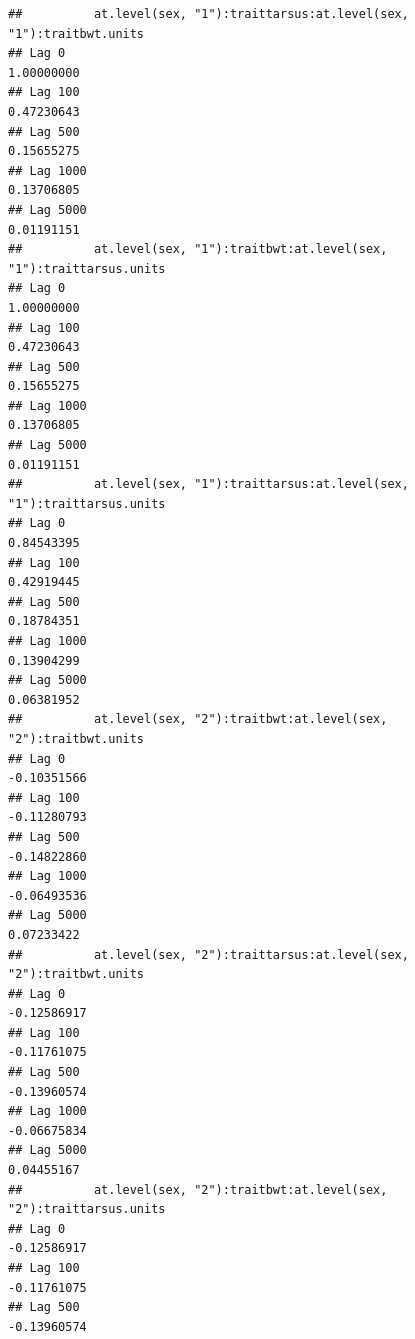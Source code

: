 \documentclass[
  12pt,
]{book}
\begin{document}
\begin{verbatim}
##          at.level(sex, "1"):traittarsus:at.level(sex, "1"):traitbwt.units
## Lag 0                                                          1.00000000
## Lag 100                                                        0.47230643
## Lag 500                                                        0.15655275
## Lag 1000                                                       0.13706805
## Lag 5000                                                       0.01191151
##          at.level(sex, "1"):traitbwt:at.level(sex, "1"):traittarsus.units
## Lag 0                                                          1.00000000
## Lag 100                                                        0.47230643
## Lag 500                                                        0.15655275
## Lag 1000                                                       0.13706805
## Lag 5000                                                       0.01191151
##          at.level(sex, "1"):traittarsus:at.level(sex, "1"):traittarsus.units
## Lag 0                                                             0.84543395
## Lag 100                                                           0.42919445
## Lag 500                                                           0.18784351
## Lag 1000                                                          0.13904299
## Lag 5000                                                          0.06381952
##          at.level(sex, "2"):traitbwt:at.level(sex, "2"):traitbwt.units
## Lag 0                                                      -0.10351566
## Lag 100                                                    -0.11280793
## Lag 500                                                    -0.14822860
## Lag 1000                                                   -0.06493536
## Lag 5000                                                    0.07233422
##          at.level(sex, "2"):traittarsus:at.level(sex, "2"):traitbwt.units
## Lag 0                                                         -0.12586917
## Lag 100                                                       -0.11761075
## Lag 500                                                       -0.13960574
## Lag 1000                                                      -0.06675834
## Lag 5000                                                       0.04455167
##          at.level(sex, "2"):traitbwt:at.level(sex, "2"):traittarsus.units
## Lag 0                                                         -0.12586917
## Lag 100                                                       -0.11761075
## Lag 500                                                       -0.13960574

\end{verbatim}
\end{document}
